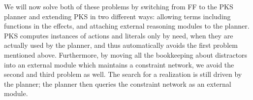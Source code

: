 We will now solve both of these problems by switching from FF to the
PKS planner \cite{Petrick-Bacchus:02} and extending PKS in two
different ways: allowing terms including functions in the effects, and
attaching external reasoning modules to the planner.  PKS computes
instances of actions and literals only by need, when they are actually
used by the planner, and thus automatically avoids the first problem
mentioned above.  Furthermore, by moving all the bookkeeping about
distractors into an external module which maintains a constraint
network, we avoid the second and third problem as well.  The search
for a realization is still driven by the planner; the planner then
queries the constraint network as an external module.




